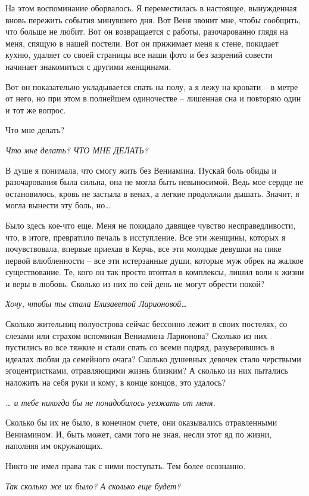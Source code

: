 \documentclass[
]{book}
\begin{document}
На этом воспоминание оборвалось. Я переместилась в настоящее, вынужденная вновь пережить события минувшего дня. Вот Веня звонит мне, чтобы сообщить, что больше не любит. Вот он возвращается с работы, разочарованно глядя на меня, спящую в нашей постели. Вот он прижимает меня к стене, покидает кухню, удаляет со своей страницы все наши фото и без зазрений совести начинает знакомиться с другими женщинами.

Вот он показательно укладывается спать на полу, а я лежу на кровати -- в метре от него, но при этом в полнейшем одиночестве -- лишенная сна и повторяю один и тот же вопрос.

Что мне делать?

\emph{Что мне делать? ЧТО МНЕ ДЕЛАТЬ?}

В душе я понимала, что смогу жить без Вениамина. Пускай боль обиды и разочарования была сильна, она не могла быть невыносимой. Ведь мое сердце не остановилось, кровь не застыла в венах, а легкие продолжали дышать. Значит, я могла вынести эту боль, но\ldots{}

Было здесь кое-что еще. Меня не покидало давящее чувство несправедливости, что, в итоге, превратило печаль в исступление. Все эти женщины, которых я почувствовала, впервые приехав в Керчь, все эти молодые девушки на пике первой влюбленности -- все эти истерзанные души, которые муж обрек на жалкое существование. Те, кого он так просто втоптал в комплексы, лишил воли к жизни и веры в любовь. Сколько из них по сей день не могут обрести покой?

\emph{Хочу, чтобы ты стала Елизаветой Ларионовой\ldots{}}

Сколько жительниц полуострова сейчас бессонно лежит в своих постелях, со слезами или страхом вспоминая Вениамина Ларионова? Сколько из них пустились во все тяжкие и стали спать со всеми подряд, разуверившись в идеалах любви да семейного очага? Сколько душевных девочек стало черствыми эгоцентристками, отравляющими жизнь близким? А сколько из них пытались наложить на себя руки и кому, в конце концов, это удалось?

\emph{\ldots{} и тебе никогда бы не понадобилось уезжать от меня.}

Сколько бы их не было, в конечном счете, они оказывались отравленными Вениамином. И, быть может, сами того не зная, несли этот яд по жизни, наполняя им окружающих.

Никто не имел права так с ними поступать. Тем более осознанно.

\emph{Так сколько же их было? А сколько еще будет?}
\end{document}
